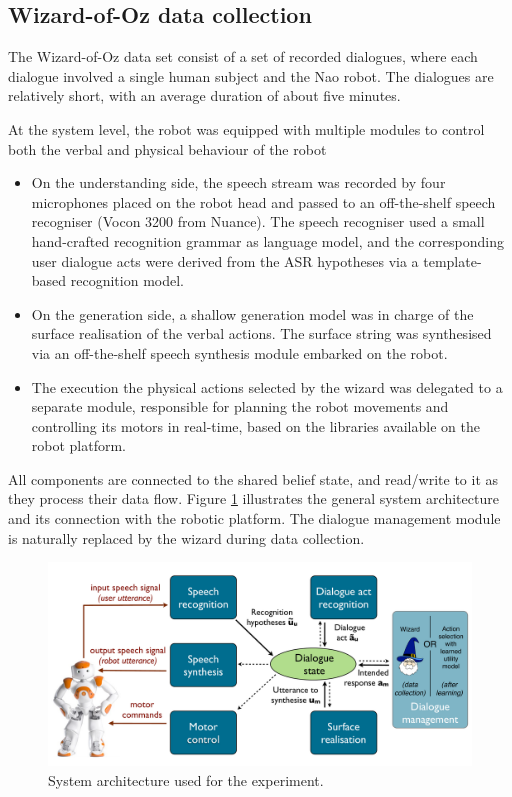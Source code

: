 \subsection{Wizard-of-Oz data collection}
\label{sec:wozlearning-experiments-woz}

The Wizard-of-Oz data set consist of a set of recorded dialogues, where each dialogue involved a single human subject and the Nao robot.  The dialogues are relatively short, with an average duration of about five minutes. 

At the system level, the robot was equipped with multiple modules to control both the verbal and physical behaviour of the robot \begin{itemize}
\item On the understanding side, the speech stream was recorded by four microphones placed on the robot head and passed to an off-the-shelf speech recogniser (Vocon 3200 from Nuance).  The speech recogniser used a small hand-crafted recognition grammar as language model, and the corresponding user dialogue acts were derived from the ASR hypotheses via a template-based recognition model. 
\item On the generation side, a shallow generation model was in charge of the surface realisation of the verbal actions.  The surface string was synthesised via an off-the-shelf speech synthesis module embarked on the robot.
\item The execution the physical actions selected by the wizard was delegated to a separate module, responsible for  planning the robot movements and controlling its motors in real-time, based on the libraries available on the robot platform. 
\end{itemize}

All components are connected to the shared belief state, and read/write to it as they process their data flow.  Figure \ref{fig:exp1_architecture} illustrates the general system architecture and its connection with the robotic platform. The dialogue management module is naturally replaced by the wizard during data collection. 

\begin{figure}[h]
\begin{center}
\includegraphics[scale=0.30]{imgs/exp1_architecture.pdf}
\end{center}
\caption{System architecture used for the experiment.}
\label{fig:exp1_architecture}
\end{figure}

